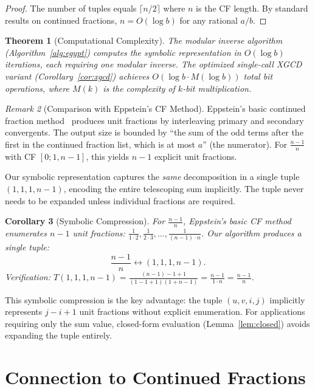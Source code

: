 \documentclass[11pt]{article}
\newtheorem{theorem}{Theorem}
\newtheorem{corollary}[theorem]{Corollary}
\theoremstyle{definition}
\theoremstyle{remark}
\newtheorem{remark}[theorem]{Remark}
\begin{document}
\begin{proof}
The number of tuples equals $\lceil n/2 \rceil$ where $n$ is the CF length.
By standard results on continued fractions, $n = O(\log b)$ for any rational $a/b$.
\end{proof}

\begin{theorem}[Computational Complexity]
The modular inverse algorithm (Algorithm~\ref{alg:egypt}) computes the symbolic
representation in $O(\log b)$ iterations, each requiring one modular inverse.
The optimized single-call XGCD variant (Corollary~\ref{cor:xgcd}) achieves
$O(\log b \cdot M(\log b))$ total bit operations, where $M(k)$ is the complexity
of $k$-bit multiplication.
\end{theorem}

\begin{remark}[Comparison with Eppstein's CF Method]
Eppstein's basic continued fraction method~\cite{eppstein} produces unit fractions
by interleaving primary and secondary convergents. The output size is bounded by
``the sum of the odd terms after the first in the continued fraction list, which
is at most $a$'' (the numerator). For $\frac{n-1}{n}$ with CF $[0; 1, n-1]$,
this yields $n-1$ explicit unit fractions.

Our symbolic representation captures the \emph{same} decomposition in a single
tuple $(1, 1, 1, n-1)$, encoding the entire telescoping sum implicitly.
The tuple never needs to be expanded unless individual fractions are required.
\end{remark}

\begin{corollary}[Symbolic Compression]
For $\frac{n-1}{n}$, Eppstein's basic CF method enumerates $n-1$ unit fractions:
$\frac{1}{1\cdot 2}, \frac{1}{2\cdot 3}, \ldots, \frac{1}{(n-1)\cdot n}$.
Our algorithm produces a \emph{single} tuple:
\[
\frac{n-1}{n} \longleftrightarrow (1, 1, 1, n-1).
\]
Verification: $T(1, 1, 1, n-1) = \frac{(n-1)-1+1}{(1-1+1)(1+n-1)} = \frac{n-1}{1 \cdot n} = \frac{n-1}{n}$. \checkmark
\end{corollary}

This symbolic compression is the key advantage: the tuple $(u, v, i, j)$ implicitly
represents $j - i + 1$ unit fractions without explicit enumeration. For applications
requiring only the sum value, closed-form evaluation (Lemma~\ref{lem:closed})
avoids expanding the tuple entirely.

\section{Connection to Continued Fractions}
\end{document}
